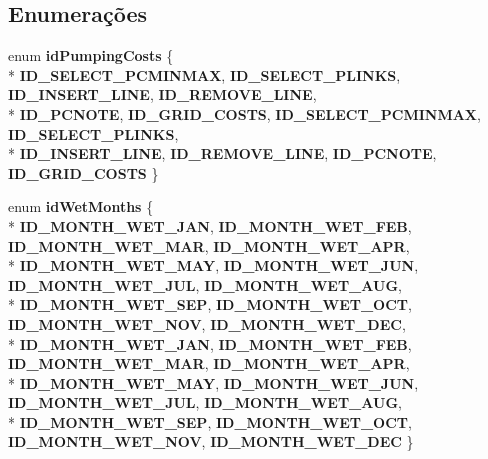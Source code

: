 \subsection*{Enumerações}
\begin{DoxyCompactItemize}
\item 
enum {\bf id\+Pumping\+Costs} \{ \\*
{\bf I\+D\+\_\+\+S\+E\+L\+E\+C\+T\+\_\+\+P\+C\+M\+I\+N\+M\+AX}, 
{\bf I\+D\+\_\+\+S\+E\+L\+E\+C\+T\+\_\+\+P\+L\+I\+N\+KS}, 
{\bf I\+D\+\_\+\+I\+N\+S\+E\+R\+T\+\_\+\+L\+I\+NE}, 
{\bf I\+D\+\_\+\+R\+E\+M\+O\+V\+E\+\_\+\+L\+I\+NE}, 
\\*
{\bf I\+D\+\_\+\+P\+C\+N\+O\+TE}, 
{\bf I\+D\+\_\+\+G\+R\+I\+D\+\_\+\+C\+O\+S\+TS}, 
{\bf I\+D\+\_\+\+S\+E\+L\+E\+C\+T\+\_\+\+P\+C\+M\+I\+N\+M\+AX}, 
{\bf I\+D\+\_\+\+S\+E\+L\+E\+C\+T\+\_\+\+P\+L\+I\+N\+KS}, 
\\*
{\bf I\+D\+\_\+\+I\+N\+S\+E\+R\+T\+\_\+\+L\+I\+NE}, 
{\bf I\+D\+\_\+\+R\+E\+M\+O\+V\+E\+\_\+\+L\+I\+NE}, 
{\bf I\+D\+\_\+\+P\+C\+N\+O\+TE}, 
{\bf I\+D\+\_\+\+G\+R\+I\+D\+\_\+\+C\+O\+S\+TS}
 \}
\item 
enum {\bf id\+Wet\+Months} \{ \\*
{\bf I\+D\+\_\+\+M\+O\+N\+T\+H\+\_\+\+W\+E\+T\+\_\+\+J\+AN}, 
{\bf I\+D\+\_\+\+M\+O\+N\+T\+H\+\_\+\+W\+E\+T\+\_\+\+F\+EB}, 
{\bf I\+D\+\_\+\+M\+O\+N\+T\+H\+\_\+\+W\+E\+T\+\_\+\+M\+AR}, 
{\bf I\+D\+\_\+\+M\+O\+N\+T\+H\+\_\+\+W\+E\+T\+\_\+\+A\+PR}, 
\\*
{\bf I\+D\+\_\+\+M\+O\+N\+T\+H\+\_\+\+W\+E\+T\+\_\+\+M\+AY}, 
{\bf I\+D\+\_\+\+M\+O\+N\+T\+H\+\_\+\+W\+E\+T\+\_\+\+J\+UN}, 
{\bf I\+D\+\_\+\+M\+O\+N\+T\+H\+\_\+\+W\+E\+T\+\_\+\+J\+UL}, 
{\bf I\+D\+\_\+\+M\+O\+N\+T\+H\+\_\+\+W\+E\+T\+\_\+\+A\+UG}, 
\\*
{\bf I\+D\+\_\+\+M\+O\+N\+T\+H\+\_\+\+W\+E\+T\+\_\+\+S\+EP}, 
{\bf I\+D\+\_\+\+M\+O\+N\+T\+H\+\_\+\+W\+E\+T\+\_\+\+O\+CT}, 
{\bf I\+D\+\_\+\+M\+O\+N\+T\+H\+\_\+\+W\+E\+T\+\_\+\+N\+OV}, 
{\bf I\+D\+\_\+\+M\+O\+N\+T\+H\+\_\+\+W\+E\+T\+\_\+\+D\+EC}, 
\\*
{\bf I\+D\+\_\+\+M\+O\+N\+T\+H\+\_\+\+W\+E\+T\+\_\+\+J\+AN}, 
{\bf I\+D\+\_\+\+M\+O\+N\+T\+H\+\_\+\+W\+E\+T\+\_\+\+F\+EB}, 
{\bf I\+D\+\_\+\+M\+O\+N\+T\+H\+\_\+\+W\+E\+T\+\_\+\+M\+AR}, 
{\bf I\+D\+\_\+\+M\+O\+N\+T\+H\+\_\+\+W\+E\+T\+\_\+\+A\+PR}, 
\\*
{\bf I\+D\+\_\+\+M\+O\+N\+T\+H\+\_\+\+W\+E\+T\+\_\+\+M\+AY}, 
{\bf I\+D\+\_\+\+M\+O\+N\+T\+H\+\_\+\+W\+E\+T\+\_\+\+J\+UN}, 
{\bf I\+D\+\_\+\+M\+O\+N\+T\+H\+\_\+\+W\+E\+T\+\_\+\+J\+UL}, 
{\bf I\+D\+\_\+\+M\+O\+N\+T\+H\+\_\+\+W\+E\+T\+\_\+\+A\+UG}, 
\\*
{\bf I\+D\+\_\+\+M\+O\+N\+T\+H\+\_\+\+W\+E\+T\+\_\+\+S\+EP}, 
{\bf I\+D\+\_\+\+M\+O\+N\+T\+H\+\_\+\+W\+E\+T\+\_\+\+O\+CT}, 
{\bf I\+D\+\_\+\+M\+O\+N\+T\+H\+\_\+\+W\+E\+T\+\_\+\+N\+OV}, 
{\bf I\+D\+\_\+\+M\+O\+N\+T\+H\+\_\+\+W\+E\+T\+\_\+\+D\+EC}
 \}
\end{DoxyCompactItemize}
